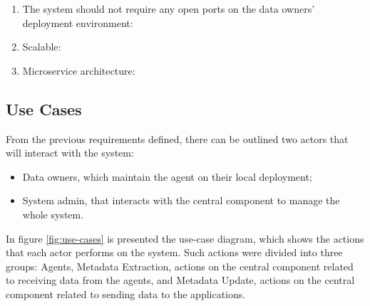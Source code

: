 \begin{enumerate}
    \item The system should not require any open ports on the data owners' deployment environment:

    \item Scalable:

    \item Microservice architecture:
\end{enumerate}

\subsection{Use Cases}

From the previous requirements defined, there can be outlined two actors that will interact with the system:

\begin{itemize}
    \item Data owners, which maintain the agent on their local deployment;
    \item System admin, that interacts with the central component to manage the whole system.
\end{itemize}

In figure \ref{fig:use-cases} is presented the use-case diagram, which shows the actions that each actor performs on the system.
Such actions were divided into three groups: Agents, Metadata Extraction, actions on the central component related to receiving data from the agents, and Metadata Update, actions on the central component related to sending data to the applications.

